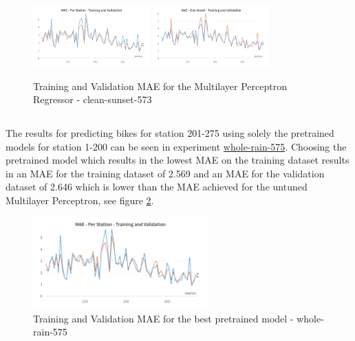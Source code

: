\documentclass[a4paper]{article}
\begin{document}
    \begin{figure}[h]
        \centering
        \includegraphics[width=0.4\textwidth]{model-per-station-clean-sunset}\hfill
        \includegraphics[width=0.4\textwidth]{onemodel-clean-sunset}
        \caption{Training and Validation MAE for the Multilayer Perceptron Regressor - clean-sunset-573}
        \label{fig:clean-sunset}
    \end{figure}

    \subsection*{}
    The results for predicting bikes for station 201-275 using solely the pretrained models for station 1-200 can be
    seen in experiment \href{https://wandb.ai/idegen/mlp-2021/runs/3rs1cuxc?workspace=user-idegen}{whole-rain-575}. Choosing
    the pretrained model which results in the lowest MAE on the training dataset results in an MAE for the training dataset of 2.569
    and an MAE for the validation dataset of 2.646 which is lower than the MAE achieved for the untuned Multilayer Perceptron,
    see figure \ref{fig:pre-trained-model}.

    \begin{figure}[h]
        \centering
        \includegraphics[width=0.6\textwidth]{pretrained-model}
        \caption{Training and Validation MAE for the best pretrained model - whole-rain-575}
        \label{fig:pre-trained-model}
    \end{figure}
\end{document}

